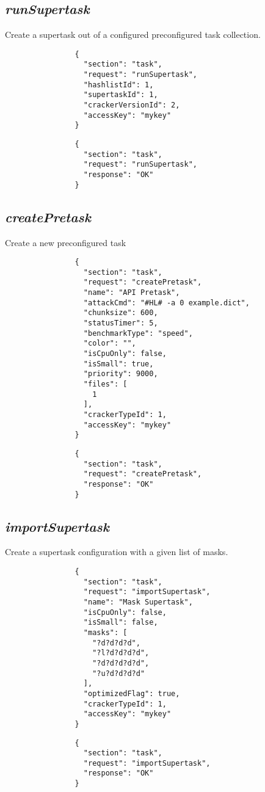 \documentclass{article}
\begin{document}
		\subsection*{\textit{runSupertask}}
			Create a supertask out of a configured preconfigured task collection.
			{
				\color{blue}
				\begin{verbatim}
				{
				  "section": "task",
				  "request": "runSupertask",
				  "hashlistId": 1,
				  "supertaskId": 1,
				  "crackerVersionId": 2,
				  "accessKey": "mykey"
				}
				\end{verbatim}
			}
			{
				\color{OliveGreen}
				\begin{verbatim}
				{
				  "section": "task",
				  "request": "runSupertask",
				  "response": "OK"
				}
				\end{verbatim}
			}
		\subsection*{\textit{createPretask}}
			Create a new preconfigured task
			{
				\color{blue}
				\begin{verbatim}
				{
				  "section": "task",
				  "request": "createPretask",
				  "name": "API Pretask",
				  "attackCmd": "#HL# -a 0 example.dict",
				  "chunksize": 600,
				  "statusTimer": 5,
				  "benchmarkType": "speed",
				  "color": "",
				  "isCpuOnly": false,
				  "isSmall": true,
				  "priority": 9000,
				  "files": [
				    1
				  ],
				  "crackerTypeId": 1,
				  "accessKey": "mykey"
				}
				\end{verbatim}
			}
			{
				\color{OliveGreen}
				\begin{verbatim}
				{
				  "section": "task",
				  "request": "createPretask",
				  "response": "OK"
				}
				\end{verbatim}
			}		
		\subsection*{\textit{importSupertask}}
			Create a supertask configuration with a given list of masks.
			{
				\color{blue}
				\begin{verbatim}
				{
				  "section": "task",
				  "request": "importSupertask",
				  "name": "Mask Supertask",
				  "isCpuOnly": false,
				  "isSmall": false,
				  "masks": [
				    "?d?d?d?d",
				    "?l?d?d?d?d",
				    "?d?d?d?d?d",
				    "?u?d?d?d?d"
				  ],
				  "optimizedFlag": true,
				  "crackerTypeId": 1,
				  "accessKey": "mykey"
				}
				\end{verbatim}
			}
			{
				\color{OliveGreen}
				\begin{verbatim}
				{
				  "section": "task",
				  "request": "importSupertask",
				  "response": "OK"
				}
				\end{verbatim}
			}		
		
\end{document}
